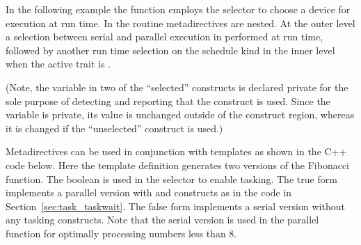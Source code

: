 In the following example the  function employs the 
selector to choose a device for execution at run time. 
In the  routine metadirectives are nested.
At the outer level a selection between serial and parallel execution in performed
at run time, followed by another run time selection on the schedule kind in the inner
level when the active  trait is .

(Note, the variable  in two of the ``selected'' constructs is declared private for the sole purpose 
of detecting and reporting that the construct is used. Since the variable is private, its value 
is unchanged outside of the construct region, whereas it is changed if the ``unselected'' construct
is used.)





\pagebreak

Metadirectives can be used in conjunction with templates as shown in the C++ code below.
Here the template definition generates two versions of the Fibonacci function.
The  boolean is used in the  selector to enable tasking.
The true form implements a parallel version with  and 
constructs as in the  code in Section~\ref{sec:task_taskwait}. 
The false form implements a serial version without any tasking constructs.
Note that the serial version is used in the parallel function for optimally
processing numbers less than 8.


